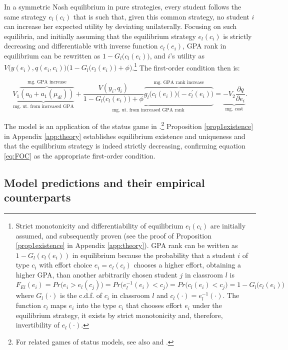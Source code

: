 In a symmetric Nash equilibrium in pure strategies, every student follows the same strategy $e_l(c_i)$ that is such that, given this common strategy, no student $i$ can increase her expected utility by deviating unilaterally. Focusing on such equilibria, and initially assuming that the equilibrium strategy $e_l(c_i)$ is strictly decreasing and differentiable with inverse function $c_l(e_i)$, GPA rank in equilibrium can be rewritten as $1-G_l\big(c_l(e_i)\big)$, and $i$'s utility as $V\big(y(e_i),q(e_i,c_i)\big)\big(1-G_l\big(c_l(e_i)\big)+\phi\big)$.\footnote{Strict monotonicity and differentiability of equilibrium $e_l(c_i)$ are initially assumed, and subsequently proven (see the proof of Proposition \ref{prop1existence} in Appendix \ref{app:theory}). GPA rank can be written as $1-G_l(c_l(e_i))$ in equilibrium because the probability that a student $i$ of type $c_i$ with effort choice $e_i=e_l(c_i)$ chooses a higher effort, obtaining a higher GPA, than another arbitrarily chosen student $j$ in classroom $l$ is $F_{El}(e_i)=Pr\big(e_i>e_l(c_j)\big)=Pr\big(e^{-1}_l(e_i)<c_j\big)=Pr\big(c_l(e_i)<c_j\big)=1-G_l\big(c_l(e_i)\big)$ where $G_l(\cdot)$ is the c.d.f. of $c_i$ in classroom $l$ and $c_l(\cdot)=e^{-1}_l(\cdot)$. The function $c_l$ maps $e_i$ into the type $c_i$ that chooses effort $e_i$ under the equilibrium strategy, it exists by strict monotonicity and, therefore, invertibility of $e_l(\cdot)$. } The first-order condition then is:


\begin{equation}\label{eq:FOC}
\underbrace{V_1 \overbrace{(a_0+a_1(\mu_{dl}))}^{\text{mg. GPA increase}}}_{\text{mg. ut. from increased GPA}}+\underbrace{\frac{V(y_i,q_i)}{1-G_l\big(c_l(e_i)\big)+\phi} 
 \overbrace{g_l\big(c_l(e_i)\big)\big(-c^{\prime}_l(e_i)\big)}^{\text{mg. GPA rank increase}}}_{\text{mg. ut. from increased GPA rank}}=\underbrace{-V_2\frac{\partial q}{\partial e_i}}_{\text{mg. cost}}.
\end{equation}

  The model is an application of the status game in \cite{hopkins2004running}.\footnote{For related games of status models, see also \cite{hoppe2009theory} and \cite{moldovanu2007contests}.} Proposition \ref{prop1existence} in Appendix \ref{app:theory} establishes equilibrium existence and uniqueness and that the equilibrium strategy is indeed strictly decreasing, confirming equation \eqref{eq:FOC} as the appropriate first-order condition.\par 


\subsection{Model predictions and their empirical counterparts}\label{sec:predictions_and_empirical}
